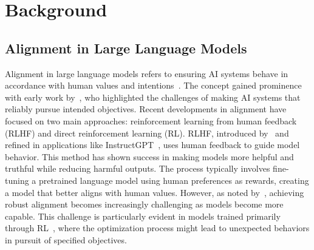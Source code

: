 \section{Background}
\subsection{Alignment in Large Language Models}
Alignment in large language models refers to ensuring AI systems behave in accordance with human values and intentions~\cite{gabriel2020artificial,vamplew2018human,liu2023trustworthy}. The concept gained prominence with early work by~\citet{amodei2016concrete}, who highlighted the challenges of making AI systems that reliably pursue intended objectives. Recent developments in alignment have focused on two main approaches: reinforcement learning from human feedback (RLHF) and direct reinforcement learning (RL).
RLHF, introduced by~\citet{christiano2017deep} and refined in applications like InstructGPT~\cite{ouyang2022training}, uses human feedback to guide model behavior. This method has shown success in making models more helpful and truthful while reducing harmful outputs. The process typically involves fine-tuning a pretrained language model using human preferences as rewards, creating a model that better aligns with human values.
However, as noted by~\citet{askell2021general}, achieving robust alignment becomes increasingly challenging as models become more capable. 
This challenge is particularly evident in models trained primarily through RL~\cite{meinke2024frontier,jaech2024openai,guo2025deepseek}, where the optimization process might lead to unexpected behaviors in pursuit of specified objectives.


